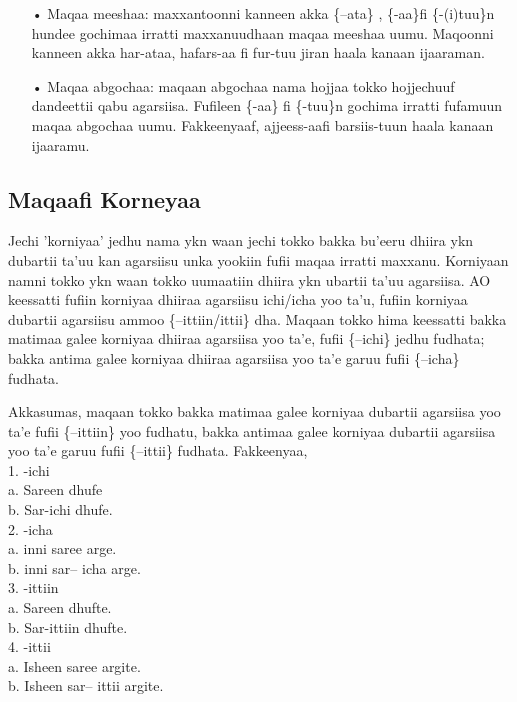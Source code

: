 \documentclass[11pt,b5paper]{book}
\begin{document}
\begin{itemize}
\item[•] Maqaa meeshaa: maxxantoonni kanneen akka \{–ata\} , \{-aa\}fi \{-(i)tuu\}n hundee gochimaa irratti maxxanuudhaan maqaa meeshaa uumu. Maqoonni kanneen akka har-ataa, hafars-aa fi fur-tuu jiran haala kanaan ijaaraman.

\item[•] Maqaa abgochaa: maqaan abgochaa nama hojjaa tokko hojjechuuf dandeettii qabu agarsiisa. Fufileen \{-aa\} fi \{-tuu\}n gochima irratti fufamuun maqaa abgochaa uumu. Fakkeenyaaf, ajjeess-aafi barsiis-tuun haala kanaan ijaaramu.
\end{itemize}

\subsection{Maqaafi Korneyaa}

Jechi 'korniyaa' jedhu nama ykn waan jechi tokko bakka bu'eeru dhiira ykn dubartii ta'uu kan agarsiisu unka yookiin fufii maqaa irratti maxxanu. Korniyaan namni tokko ykn waan tokko uumaatiin dhiira ykn ubartii ta'uu agarsiisa. AO keessatti fufiin korniyaa dhiiraa agarsiisu ichi/icha yoo ta'u, fufiin korniyaa dubartii agarsiisu ammoo \{–ittiin/ittii\} dha. Maqaan tokko hima keessatti bakka matimaa galee korniyaa dhiiraa agarsiisa yoo ta'e, fufii \{–ichi\} jedhu fudhata; bakka antima galee korniyaa dhiiraa agarsiisa yoo ta'e garuu fufii \{–icha\} fudhata. 

Akkasumas, maqaan tokko bakka matimaa galee korniyaa dubartii agarsiisa yoo ta'e fufii \{–ittiin\} yoo fudhatu, bakka antimaa galee korniyaa dubartii agarsiisa yoo ta'e garuu fufii \{–ittii\} fudhata. Fakkeenyaa,\\
1. -ichi\\
a. Sareen dhufe\\
b. Sar-ichi dhufe.\\
2. -icha\\
a. inni saree arge.\\
b. inni sar– icha arge.\\
3. -ittiin\\
a. Sareen dhufte.\\
b. Sar-ittiin dhufte.\\
4. -ittii\\
a. Isheen saree argite.\\
b. Isheen sar– ittii argite. 
\end{document}
